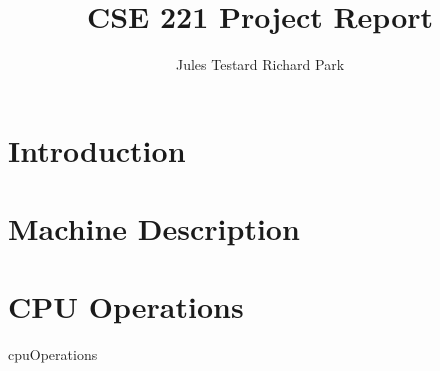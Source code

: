 \documentclass[11pt,twocolumn]{article}
\begin{document}
\title{CSE 221 Project Report}
\author{Jules Testard \quad Richard Park}
\maketitle

\section{Introduction}



\section{Machine Description}



\section{CPU Operations}

 {cpuOperations}



\end{document}

